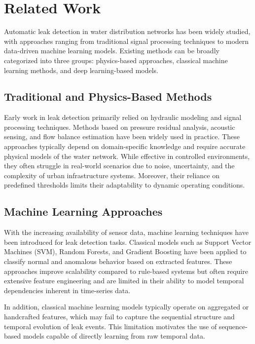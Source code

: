 \section{Related Work}

Automatic leak detection in water distribution networks has been widely studied,
with approaches ranging from traditional signal processing techniques to modern
data-driven machine learning models. Existing methods can be broadly categorized
into three groups: physics-based approaches, classical machine learning methods,
and deep learning-based models.

\subsection{Traditional and Physics-Based Methods}

Early work in leak detection primarily relied on hydraulic modeling and
signal processing techniques. Methods based on pressure residual analysis,
acoustic sensing, and flow balance estimation have been widely used in practice.
These approaches typically depend on domain-specific knowledge and require
accurate physical models of the water network. While effective in controlled
environments, they often struggle in real-world scenarios due to noise,
uncertainty, and the complexity of urban infrastructure systems. Moreover,
their reliance on predefined thresholds limits their adaptability to dynamic
operating conditions.

\subsection{Machine Learning Approaches}

With the increasing availability of sensor data, machine learning techniques
have been introduced for leak detection tasks. Classical models such as
Support Vector Machines (SVM), Random Forests, and Gradient Boosting have been
applied to classify normal and anomalous behavior based on extracted features.
These approaches improve scalability compared to rule-based systems but often
require extensive feature engineering and are limited in their ability to model
temporal dependencies inherent in time-series data.

In addition, classical machine learning models typically operate on aggregated
or handcrafted features, which may fail to capture the sequential structure and
temporal evolution of leak events. This limitation motivates the use of
sequence-based models capable of directly learning from raw temporal data.

